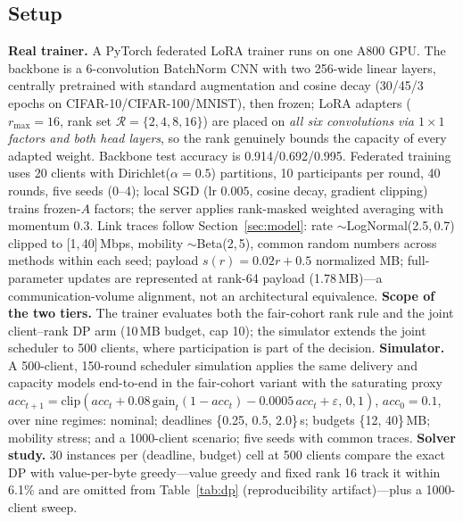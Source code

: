 \documentclass[conference]{IEEEtran}
\begin{document}
\subsection{Setup}
\textbf{Real trainer.} A PyTorch federated LoRA trainer runs on one A800 GPU. The backbone is a 6-convolution BatchNorm CNN with two 256-wide linear layers, centrally pretrained with standard augmentation and cosine decay (30/45/3 epochs on CIFAR-10/CIFAR-100/MNIST), then frozen; LoRA adapters ($r_{\max}{=}16$, rank set $\mathcal R{=}\{2,4,8,16\}$) are placed on \emph{all six convolutions via $1{\times}1$ factors and both head layers}, so the rank genuinely bounds the capacity of every adapted weight. Backbone test accuracy is 0.914/0.692/0.995. Federated training uses 20 clients with Dirichlet($\alpha{=}0.5$) partitions, 10 participants per round, 40 rounds, five seeds (0--4); local SGD (lr $0.005$, cosine decay, gradient clipping) trains frozen-$A$ factors; the server applies rank-masked weighted averaging with momentum 0.3. Link traces follow Section~\ref{sec:model}: rate $\sim$LogNormal(2.5,\,0.7) clipped to [1,\,40]\,Mbps, mobility $\sim$Beta(2,\,5), common random numbers across methods within each seed; payload $s(r){=}0.02r{+}0.5$ normalized MB; full-parameter updates are represented at rank-64 payload (1.78\,MB)---a communication-volume alignment, not an architectural equivalence.
\textbf{Scope of the two tiers.} The trainer evaluates both the fair-cohort rank rule and the joint client--rank DP arm (10\,MB budget, cap 10); the simulator extends the joint scheduler to 500 clients, where participation is part of the decision.
\textbf{Simulator.} A 500-client, 150-round scheduler simulation applies the same delivery and capacity models end-to-end in the fair-cohort variant with the saturating proxy $acc_{t+1}=\mathrm{clip}(acc_t+0.08\,\mathrm{gain}_t(1-acc_t)-0.0005\,acc_t+\varepsilon,\,0,1)$, $acc_0{=}0.1$, over nine regimes: nominal; deadlines \{0.25, 0.5, 2.0\}\,s; budgets \{12, 40\}\,MB; mobility stress; and a 1000-client scenario; five seeds with common traces.
\textbf{Solver study.} 30 instances per (deadline, budget) cell at 500 clients compare the exact DP with value-per-byte greedy---value greedy and fixed rank 16 track it within 6.1\% and are omitted from Table~\ref{tab:dp} (reproducibility artifact)---plus a 1000-client sweep.
\end{document}
